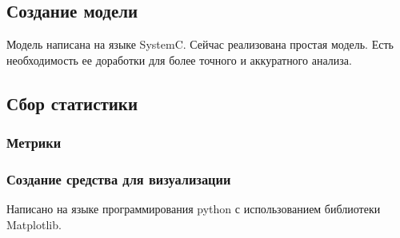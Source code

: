 \subsection{Создание модели}

Модель написана на языке SystemC. Сейчас реализована простая модель. Есть необходимость ее доработки для более точного и аккуратного анализа.

\subsection{Сбор статистики}

\subsubsection{Метрики}

\subsubsection{Создание средства для визуализации}

Написано на языке программирования python с использованием библиотеки Matplotlib.

\clearpage

